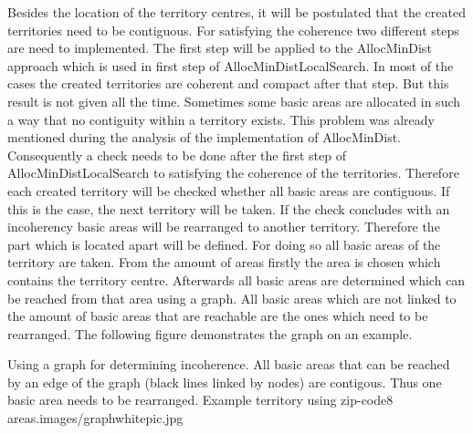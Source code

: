 Besides the location of the territory centres, it will be postulated that the created territories need to be contiguous. For satisfying the coherence two different steps are need to implemented. The first step will be applied to the AllocMinDist approach which is used in first step of AllocMinDistLocalSearch. In most of the cases the created territories are coherent and compact after that step. But this result is not given all the time. Sometimes some basic areas are allocated in such a way that no contiguity within a territory exists. This problem was already mentioned during the analysis of the implementation of AllocMinDist. Consequently a check needs to be done after the first step of AllocMinDistLocalSearch to satisfying the coherence of the territories. Therefore each created territory will be checked whether all basic areas are contiguous. If this is the case, the next territory will be taken. If the check concludes with an incoherency basic areas will be rearranged to another territory. Therefore the part which is located apart will be defined. For doing so all basic areas of the territory are taken. From the amount of areas firstly the area is chosen which contains the territory centre. Afterwards all basic areas are determined which can be reached from that area using a graph. All basic areas which are not linked to the amount of basic areas that are reachable are the ones which need to be rearranged. The following figure demonstrates the graph on an example.

\begin{figureOwn}{Using a graph for determining incoherence. All basic areas that can be reached by an edge of the graph (black lines linked by nodes) are contigous. Thus one basic area needs to be rearranged. Example territory using zip-code8 areas.}{images/graphwhitepic.jpg}\end{figureOwn}

